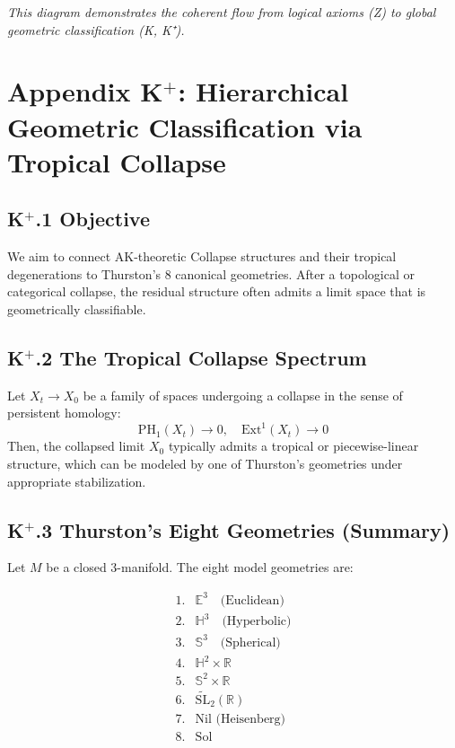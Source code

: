 \documentclass[11pt]{article}
\begin{document}
\begin{axiom}
\begin{axiom}
\textit{This diagram demonstrates the coherent flow from logical axioms (Z) to global geometric classification (K, K⁺).}




\section*{Appendix K$^+$: Hierarchical Geometric Classification via Tropical Collapse}

\subsection*{K$^+$.1 Objective}

We aim to connect AK-theoretic Collapse structures and their tropical degenerations  
to Thurston's 8 canonical geometries. After a topological or categorical collapse, the residual structure  
often admits a limit space that is geometrically classifiable.

\subsection*{K$^+$.2 The Tropical Collapse Spectrum}

Let \( X_t \to X_0 \) be a family of spaces undergoing a collapse in the sense of persistent homology:
\[
\mathrm{PH}_1(X_t) \to 0, \quad \mathrm{Ext}^1(X_t) \to 0
\]
Then, the collapsed limit \( X_0 \) typically admits a tropical or piecewise-linear structure,  
which can be modeled by one of Thurston's geometries under appropriate stabilization.

\subsection*{K$^+$.3 Thurston's Eight Geometries (Summary)}

Let \( M \) be a closed 3-manifold. The eight model geometries are:

\[
\begin{array}{ll}
1. & \mathbb{E}^3 \quad \text{(Euclidean)} \\
2. & \mathbb{H}^3 \quad \text{(Hyperbolic)} \\
3. & \mathbb{S}^3 \quad \text{(Spherical)} \\
4. & \mathbb{H}^2 \times \mathbb{R} \\
5. & \mathbb{S}^2 \times \mathbb{R} \\
6. & \widetilde{\mathrm{SL}}_2(\mathbb{R}) \\
7. & \text{Nil (Heisenberg)} \\
8. & \text{Sol}
\end{array}
\]


\end{axiom}
\end{axiom}
\end{document}

